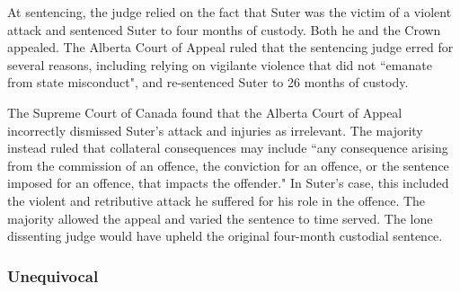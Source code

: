 At sentencing, the judge relied on the fact that Suter was the victim of a violent attack and sentenced Suter to four months of custody. Both he and the Crown appealed. The Alberta Court of Appeal ruled that the sentencing judge erred for several reasons, including relying on vigilante violence that did not ``emanate from state misconduct", and re-sentenced Suter to 26 months of custody.

The Supreme Court of Canada found that the Alberta Court of Appeal incorrectly dismissed Suter's attack and injuries as irrelevant. The majority instead ruled that collateral consequences may include ``any consequence arising from the commission of an offence, the conviction for an offence, or the sentence imposed for an offence, that impacts the offender." In Suter's case, this included the violent and retributive attack he suffered for his role in the offence. The majority allowed the appeal and varied the sentence to time served. The lone dissenting judge would have upheld the original four-month custodial sentence.

\subsubsection{Unequivocal}

